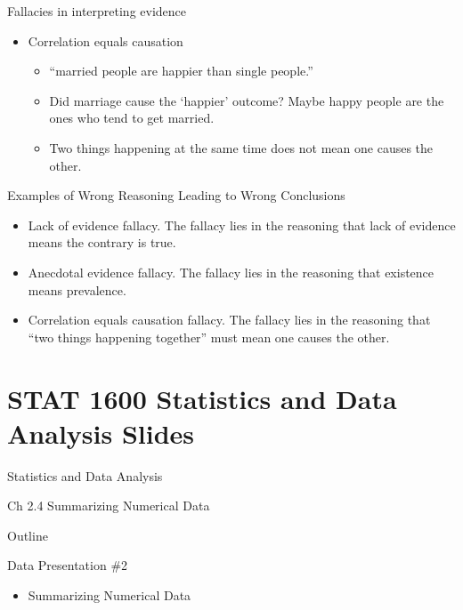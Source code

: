 \documentclass[14pt]{beamer}\usepackage[]{graphicx}\usepackage[]{color}
\begin{document}
\begin{frame}[fragile]{Fallacies in interpreting evidence}

\begin{itemize}
\item Correlation equals causation
  \begin{itemize}
  \item ``married people are happier than single people.''
  \item Did marriage cause the `happier' outcome?  Maybe happy people are the ones who tend to get married.
  \item Two things happening at the same time does not mean one causes the other.
  \end{itemize}
\end{itemize}
\end{frame}

\begin{frame}[fragile]{Examples of Wrong Reasoning Leading to Wrong Conclusions}

\begin{itemize}
\item Lack of evidence fallacy.  The fallacy lies in the reasoning that lack of evidence means the contrary is true.
\item Anecdotal evidence fallacy.  The fallacy lies in the reasoning that existence means prevalence.
\item Correlation equals causation fallacy.  The fallacy lies in the reasoning that ``two things happening together'' must mean one causes the other.
\end{itemize}
\end{frame}



\section{STAT 1600 Statistics and Data Analysis Slides}

\begin{frame}[fragile]{Statistics and Data Analysis}

Ch 2.4 Summarizing  Numerical Data

\end{frame}

\begin{frame}[fragile]{Outline}

Data Presentation \#2  

\begin{itemize}
\item Summarizing Numerical Data
\end{itemize}
\end{frame}
\end{document}
